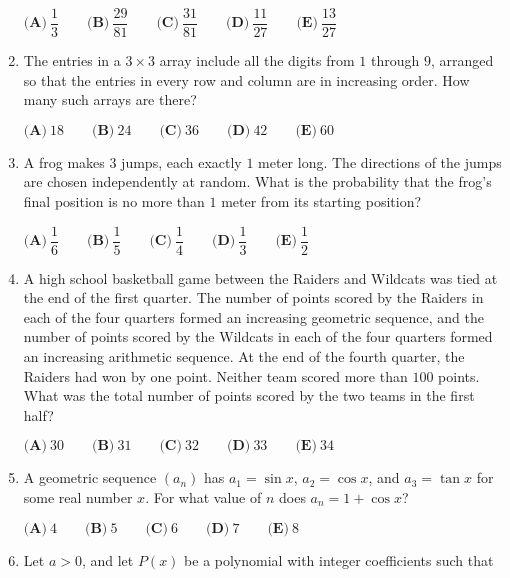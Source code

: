 \documentclass{article}
\begin{document}
\begin{enumerate}[label=\arabic*., itemsep=0.5em]
\(\textbf{(A)}\ \dfrac{1}{3} \qquad \textbf{(B)}\ \dfrac{29}{81} \qquad \textbf{(C)}\ \dfrac{31}{81} \qquad \textbf{(D)}\ \dfrac{11}{27} \qquad \textbf{(E)}\ \dfrac{13}{27}\)\par \vspace{0.5em}\item The entries in a \(3 \times 3\) array include all the digits from \(1\) through \(9\), arranged so that the entries in every row and column are in increasing order. How many such arrays are there?

\(\textbf{(A)}\ 18 \qquad \textbf{(B)}\ 24 \qquad \textbf{(C)}\ 36 \qquad \textbf{(D)}\ 42 \qquad \textbf{(E)}\ 60\)\par \vspace{0.5em}\item A frog makes \(3\) jumps, each exactly \(1\) meter long. The directions of the jumps are chosen independently at random. What is the probability that the frog's final position is no more than \(1\) meter from its starting position?

\(\textbf{(A)}\ \dfrac{1}{6} \qquad \textbf{(B)}\ \dfrac{1}{5} \qquad \textbf{(C)}\ \dfrac{1}{4} \qquad \textbf{(D)}\ \dfrac{1}{3} \qquad \textbf{(E)}\ \dfrac{1}{2}\)\par \vspace{0.5em}\item A high school basketball game between the Raiders and Wildcats was tied at the end of the first quarter. The number of points scored by the Raiders in each of the four quarters formed an increasing geometric sequence, and the number of points scored by the Wildcats in each of the four quarters formed an increasing arithmetic sequence. At the end of the fourth quarter, the Raiders had won by one point. Neither team scored more than \(100\) points. What was the total number of points scored by the two teams in the first half?

\(\textbf{(A)}\ 30 \qquad \textbf{(B)}\ 31 \qquad \textbf{(C)}\ 32 \qquad \textbf{(D)}\ 33 \qquad \textbf{(E)}\ 34\)\par \vspace{0.5em}\item A geometric sequence \((a_n)\) has \(a_1=\sin x\), \(a_2=\cos x\), and \(a_3= \tan x\) for some real number \(x\). For what value of \(n\) does \(a_n=1+\cos x\)?


\(\textbf{(A)}\ 4 \qquad \textbf{(B)}\ 5 \qquad \textbf{(C)}\ 6 \qquad \textbf{(D)}\ 7 \qquad \textbf{(E)}\ 8\)\par \vspace{0.5em}\item Let \(a > 0\), and let \(P(x)\) be a polynomial with integer coefficients such that


\end{enumerate}
\end{document}
